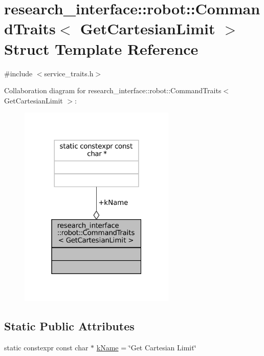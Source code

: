 \hypertarget{structresearch__interface_1_1robot_1_1CommandTraits_3_01GetCartesianLimit_01_4}{}\section{research\+\_\+interface\+:\+:robot\+:\+:Command\+Traits$<$ Get\+Cartesian\+Limit $>$ Struct Template Reference}
\label{structresearch__interface_1_1robot_1_1CommandTraits_3_01GetCartesianLimit_01_4}


{\ttfamily \#include $<$service\+\_\+traits.\+h$>$}



Collaboration diagram for research\+\_\+interface\+:\+:robot\+:\+:Command\+Traits$<$ Get\+Cartesian\+Limit $>$\+:
\nopagebreak
\begin{figure}[H]
\begin{center}
\leavevmode
\includegraphics[width=211pt]{structresearch__interface_1_1robot_1_1CommandTraits_3_01GetCartesianLimit_01_4__coll__graph}
\end{center}
\end{figure}
\subsection*{Static Public Attributes}
\begin{DoxyCompactItemize}
\item 
static constexpr const char $\ast$ \hyperlink{structresearch__interface_1_1robot_1_1CommandTraits_3_01GetCartesianLimit_01_4_af357a46f60e7eec9873ff36151c536bd}{k\+Name} = \char`\"{}Get Cartesian Limit\char`\"{}
\end{DoxyCompactItemize}


